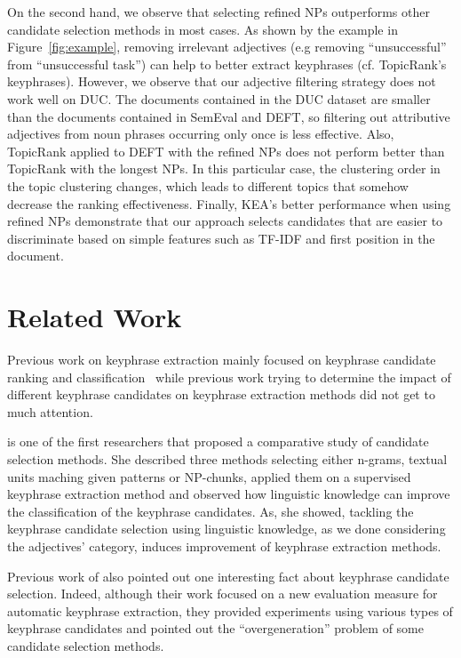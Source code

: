       On the second hand, we observe that selecting refined NPs outperforms
      other candidate selection methods in most cases. As shown by the example
      in Figure~\ref{fig:example}, removing irrelevant adjectives (e.g removing
      ``unsuccessful'' from ``unsuccessful task'') can help to better extract
      keyphrases (cf. TopicRank's keyphrases). However, we observe that
      our adjective filtering strategy does not work well on DUC. The documents
      contained in the DUC dataset are smaller than the documents contained in
      SemEval and DEFT, so filtering out attributive adjectives from noun
      phrases occurring only once is less effective. Also, TopicRank applied to
      DEFT with the refined NPs does not perform better than TopicRank with the
      longest NPs. In this particular case, the clustering order in the topic
      clustering changes, which leads to different topics that somehow decrease
      the ranking effectiveness. Finally, KEA's better performance when using
      refined NPs demonstrate that our approach selects candidates that are
      easier to discriminate based on simple features such as TF-IDF and first
      position in the document.

\section{Related Work}
\label{sec:related_work}
  Previous work on keyphrase extraction mainly focused on keyphrase candidate
  ranking and classification~\cite{hasan2014state_of_the_art} while previous
  work trying to determine the impact of different keyphrase candidates on
  keyphrase extraction methods did not get to much attention.

   is one of the first researchers that
  proposed a comparative study of candidate selection methods. She described
  three methods selecting either n-grams, textual units maching given patterns
  or NP-chunks, applied them on a supervised keyphrase extraction method and
  observed how linguistic knowledge can improve the classification of the
  keyphrase candidates. As, she showed, tackling the keyphrase candidate
  selection using linguistic knowledge, as we done considering the adjectives'
  category, induces improvement of keyphrase extraction methods.

  Previous work of  also pointed out one
  interesting fact about keyphrase candidate selection. Indeed, although their
  work focused on a new evaluation measure for automatic keyphrase extraction,
  they provided experiments using various types of keyphrase candidates and
  pointed out the ``overgeneration'' problem of some candidate selection
  methods.

